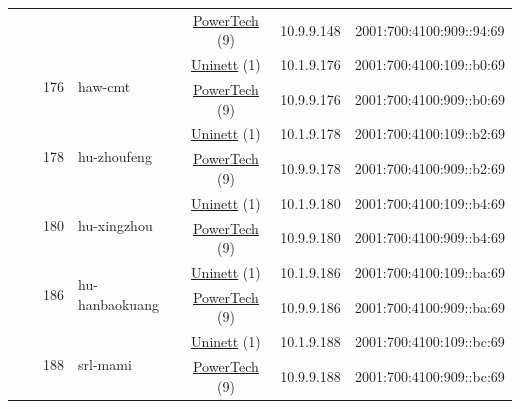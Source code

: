 \begin{small}
\begin{center}
\begin{longtable}{|c|c|c|c|c|c|c|c|}
  &  &  &  & \multicolumn{2}{|c|}{\tiny{\href{http://www.powertech.no}{PowerTech} (9)}} & \tiny{10.9.9.148} & \tiny{2001:700:4100:909::94:69} \\* \cline{3-3}\cline{4-4}\cline{5-5}\cline{6-6}\cline{7-7}\cline{8-8}
  &  & \multirow{2}{*}{\tiny{176}} & \multicolumn{1}{|l|}{\multirow{2}{*}{\tiny{haw-cmt}}} & \multicolumn{2}{|c|}{\tiny{\href{https://www.uninett.no}{Uninett} (1)}} & \tiny{10.1.9.176} & \tiny{2001:700:4100:109::b0:69} \\* \cline{5-5}\cline{6-6}\cline{7-7}\cline{8-8}
  &  &  &  & \multicolumn{2}{|c|}{\tiny{\href{http://www.powertech.no}{PowerTech} (9)}} & \tiny{10.9.9.176} & \tiny{2001:700:4100:909::b0:69} \\* \cline{3-3}\cline{4-4}\cline{5-5}\cline{6-6}\cline{7-7}\cline{8-8}
  &  & \multirow{2}{*}{\tiny{178}} & \multicolumn{1}{|l|}{\multirow{2}{*}{\tiny{hu-zhoufeng}}} & \multicolumn{2}{|c|}{\tiny{\href{https://www.uninett.no}{Uninett} (1)}} & \tiny{10.1.9.178} & \tiny{2001:700:4100:109::b2:69} \\* \cline{5-5}\cline{6-6}\cline{7-7}\cline{8-8}
  &  &  &  & \multicolumn{2}{|c|}{\tiny{\href{http://www.powertech.no}{PowerTech} (9)}} & \tiny{10.9.9.178} & \tiny{2001:700:4100:909::b2:69} \\* \cline{3-3}\cline{4-4}\cline{5-5}\cline{6-6}\cline{7-7}\cline{8-8}
  &  & \multirow{2}{*}{\tiny{180}} & \multicolumn{1}{|l|}{\multirow{2}{*}{\tiny{hu-xingzhou}}} & \multicolumn{2}{|c|}{\tiny{\href{https://www.uninett.no}{Uninett} (1)}} & \tiny{10.1.9.180} & \tiny{2001:700:4100:109::b4:69} \\* \cline{5-5}\cline{6-6}\cline{7-7}\cline{8-8}
  &  &  &  & \multicolumn{2}{|c|}{\tiny{\href{http://www.powertech.no}{PowerTech} (9)}} & \tiny{10.9.9.180} & \tiny{2001:700:4100:909::b4:69} \\* \cline{3-3}\cline{4-4}\cline{5-5}\cline{6-6}\cline{7-7}\cline{8-8}
  &  & \multirow{2}{*}{\tiny{186}} & \multicolumn{1}{|l|}{\multirow{2}{*}{\tiny{hu-hanbaokuang}}} & \multicolumn{2}{|c|}{\tiny{\href{https://www.uninett.no}{Uninett} (1)}} & \tiny{10.1.9.186} & \tiny{2001:700:4100:109::ba:69} \\* \cline{5-5}\cline{6-6}\cline{7-7}\cline{8-8}
  &  &  &  & \multicolumn{2}{|c|}{\tiny{\href{http://www.powertech.no}{PowerTech} (9)}} & \tiny{10.9.9.186} & \tiny{2001:700:4100:909::ba:69} \\* \cline{3-3}\cline{4-4}\cline{5-5}\cline{6-6}\cline{7-7}\cline{8-8}
  &  & \multirow{2}{*}{\tiny{188}} & \multicolumn{1}{|l|}{\multirow{2}{*}{\tiny{srl-mami}}} & \multicolumn{2}{|c|}{\tiny{\href{https://www.uninett.no}{Uninett} (1)}} & \tiny{10.1.9.188} & \tiny{2001:700:4100:109::bc:69} \\* \cline{5-5}\cline{6-6}\cline{7-7}\cline{8-8}
  &  &  &  & \multicolumn{2}{|c|}{\tiny{\href{http://www.powertech.no}{PowerTech} (9)}} & \tiny{10.9.9.188} & \tiny{2001:700:4100:909::bc:69} \\ \hline
\end{longtable}
\end{center}
\end{small}
